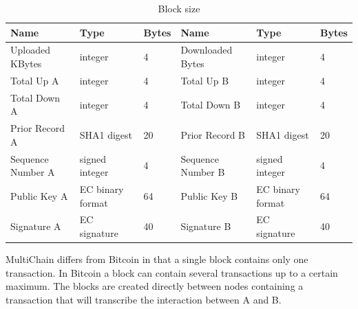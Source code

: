 \begin{table}[]
\begin{adjustwidth}{-.5in}{-.5in}
\begin{center}
\begin{tabular}{l|lll|ll}
Name              & Type             & Bytes                   & Name              & Type             & Bytes \\ \hline
Uploaded KBytes   & integer          & \multicolumn{1}{l|}{4}  & Downloaded Bytes  & integer          & 4     \\
Total Up A        & integer          & \multicolumn{1}{l|}{4}  & Total Up B        & integer          & 4     \\
Total Down A      & integer          & \multicolumn{1}{l|}{4}  & Total Down B      & integer          & 4     \\
Prior Record A    & SHA1 digest      & \multicolumn{1}{l|}{20} & Prior Record B    & SHA1 digest      & 20    \\
Sequence Number A & signed integer   & \multicolumn{1}{l|}{4}  & Sequence Number B & signed integer   & 4     \\
Public Key A      & EC binary format & \multicolumn{1}{l|}{64} & Public Key B      & EC binary format & 64    \\
Signature A       & EC signature     & \multicolumn{1}{l|}{40} & Signature B       & EC signature     & 40
\end{tabular}
\caption{Block size}
\label{table:block_size}
\end{center}
\end{adjustwidth}
\end{table}

MultiChain differs from Bitcoin in that a single block contains only one transaction.
In Bitcoin a block can contain several transactions up to a certain maximum.
The blocks are created directly between nodes containing a transaction
that will transcribe the interaction between A and B.